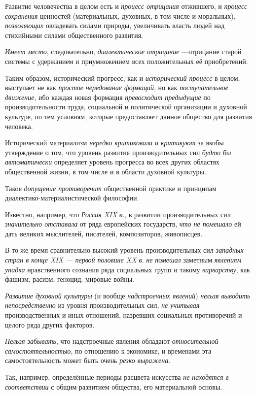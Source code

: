\documentclass[a4paper,14pt,russian]{extreport}
\begin{document}
Развитие человечества в целом есть и \emph{процесс отрицания} отжившего, и \emph{процесс сохранения} ценностей (материальных, духовных, в том числе и моральных), \emph{позволяющих} овладевать силами природы, увеличивать власть людей над стихийными силами общественного развития.

\emph{Имеет место}, следовательно, \emph{диалектическое отрицание} ---отрицание старой системы с удержанием и приумножением всех положительных её приобретений.

Таким образом, исторический прогресс, как и \emph{исторический процесс} в целом, выступает не как \emph{простое чередование формаций}, но как \emph{поступательное движение}, ибо каждая новая формация \emph{превосходит предыдущие} по производительности труда, социальной и политической организации и духовной культуре, по тем условиям, которые предоставляет данное общество для развития человека.

Исторический материализм \emph{нередко критиковали и критикуют} за якобы утверждение о том, что уровень развития производительных сил \emph{будто бы автоматически} определяет уровень прогресса во всех других областях общественной жизни, в том числе и в области духовной культуры.

Такое \emph{допущение противоречит} общественной практике и принципам диалектико-материалистической философии.

Известно, например, что \emph{Россия XIX в}., в развитии производительных сил \emph{значительно отставала} от ряда европейских государств, \emph{что не помешало} ей дать великих мыслителей, писателей, композиторов, живописцев.

В то же время сравнительно высокий уровень производительных сил \emph{западных стран в конце XIX --- первой половине XX в}. \emph{не помешал} заметным \emph{явлениям упадка} нравственного сознания ряда социальных групп и такому \emph{варварству}, как фашизм, расизм, геноцид, мировые войны.

\emph{Развитие духовной культуры} (и вообще \emph{надстроечных явлений}) \emph{нельзя выводить непосредственно} из уровня производительных сил, \emph{не учитывая} производственных и иных отношений, назревших социальных противоречий и целого ряда других факторов.

\emph{Нельзя забывать}, что надстроечные явления обладают \emph{относительной самостоятельностью}, по отношению к экономике, и временами эта самостоятельность может быть очень \emph{резко выражена}.

Так, например, определённые периоды расцвета искусства \emph{не находятся в соответствии} с общим развитием общества, его материальной основы.
\end{document}

